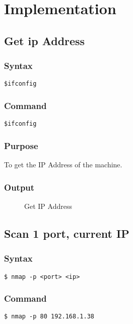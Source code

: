 \documentclass[11pt]{article}
\begin{document}
\section{Implementation}

\subsection{Get ip Address}

\subsubsection*{Syntax}
\begin{verbatim}
$ifconfig
\end{verbatim}

\subsubsection*{Command}
\begin{verbatim}
$ifconfig
\end{verbatim}

\subsubsection*{Purpose}
To get the IP Address of the machine.

\subsubsection*{Output}
\begin{figure}[H]
    \centering
    \caption{Get IP Address}
    \label{fig:1}
\end{figure}

\subsection{Scan 1 port, current IP}

\subsubsection{Syntax}
\begin{verbatim}
$ nmap -p <port> <ip>
\end{verbatim}

\subsubsection*{Command}
\begin{verbatim}
$ nmap -p 80 192.168.1.38
\end{verbatim}
\end{document}
